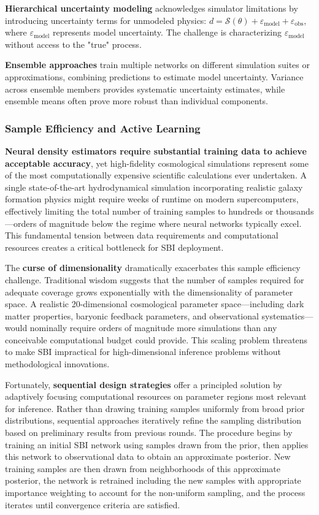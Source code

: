 \documentclass{SciPost}
\begin{document}
\textbf{Hierarchical uncertainty modeling} acknowledges simulator limitations by introducing uncertainty terms for unmodeled physics: $d = \mathcal{S}(\theta) + \varepsilon_{\text{model}} + \varepsilon_{\text{obs}}$, where $\varepsilon_{\text{model}}$ represents model uncertainty. The challenge is characterizing $\varepsilon_{\text{model}}$ without access to the "true" process.

\textbf{Ensemble approaches} train multiple networks on different simulation suites or approximations, combining predictions to estimate model uncertainty. Variance across ensemble members provides systematic uncertainty estimates, while ensemble means often prove more robust than individual components.

\subsubsection{Sample Efficiency and Active Learning}

\textbf{Neural density estimators require substantial training data to achieve acceptable accuracy}, yet high-fidelity cosmological simulations represent some of the most computationally expensive scientific calculations ever undertaken. A single state-of-the-art hydrodynamical simulation incorporating realistic galaxy formation physics might require weeks of runtime on modern supercomputers, effectively limiting the total number of training samples to hundreds or thousands—orders of magnitude below the regime where neural networks typically excel. This fundamental tension between data requirements and computational resources creates a critical bottleneck for SBI deployment.

The \textbf{curse of dimensionality} dramatically exacerbates this sample efficiency challenge. Traditional wisdom suggests that the number of samples required for adequate coverage grows exponentially with the dimensionality of parameter space. A realistic 20-dimensional cosmological parameter space—including dark matter properties, baryonic feedback parameters, and observational systematics—would nominally require orders of magnitude more simulations than any conceivable computational budget could provide. This scaling problem threatens to make SBI impractical for high-dimensional inference problems without methodological innovations.

Fortunately, \textbf{sequential design strategies} offer a principled solution by adaptively focusing computational resources on parameter regions most relevant for inference. Rather than drawing training samples uniformly from broad prior distributions, sequential approaches iteratively refine the sampling distribution based on preliminary results from previous rounds. The procedure begins by training an initial SBI network using samples drawn from the prior, then applies this network to observational data to obtain an approximate posterior. New training samples are then drawn from neighborhoods of this approximate posterior, the network is retrained including the new samples with appropriate importance weighting to account for the non-uniform sampling, and the process iterates until convergence criteria are satisfied.
\end{document}
